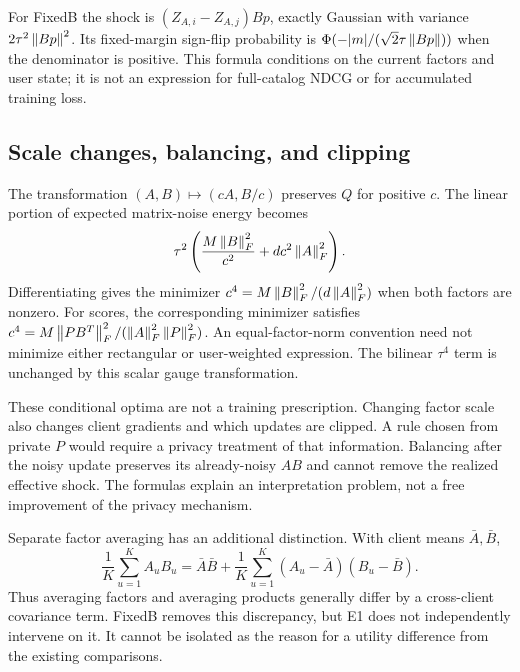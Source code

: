 For FixedB the shock is $(Z_{A,i}-Z_{A,j})Bp$, exactly Gaussian with
variance $2\tau^2\left\lVert Bp\right\rVert^2$. Its fixed-margin sign-flip probability is
$\Phi(-|m|/(\sqrt{2}\tau\left\lVert Bp\right\rVert))$ when the denominator is positive.
This formula conditions on the current factors and user state; it is not
an expression for full-catalog NDCG or for accumulated training loss.

\subsection{Scale changes, balancing, and clipping}
The transformation $(A,B)\mapsto(cA,B/c)$ preserves $Q$ for positive $c$.
The linear portion of expected matrix-noise energy becomes
\begin{equation}
 \tau^2\left(\frac{M\left\lVert B\right\rVert_F^2}{c^2}
                       +dc^2\left\lVert A\right\rVert_F^2\right).
\end{equation}
Differentiating gives the minimizer
$c^4=M\left\lVert B\right\rVert_F^2/(d\left\lVert A\right\rVert_F^2)$ when both factors are nonzero.
For scores, the corresponding minimizer satisfies
$c^4=M\left\lVert PB^T\right\rVert_F^2/(\left\lVert A\right\rVert_F^2\left\lVert P\right\rVert_F^2)$.
An equal-factor-norm convention need not minimize either rectangular or
user-weighted expression. The bilinear $\tau^4$ term is unchanged by
this scalar gauge transformation.

These conditional optima are not a training prescription. Changing factor
scale also changes client gradients and which updates are clipped. A rule
chosen from private $P$ would require a privacy treatment of that information.
Balancing after the noisy update preserves its already-noisy $AB$ and
cannot remove the realized effective shock. The formulas explain an
interpretation problem, not a free improvement of the privacy mechanism.

Separate factor averaging has an additional distinction. With client means
$\bar A,\bar B$,
\begin{equation}
 \frac1K\sum_{u=1}^K A_uB_u
 =\bar A\bar B+\frac1K\sum_{u=1}^K(A_u-\bar A)(B_u-\bar B).
\end{equation}
Thus averaging factors and averaging products generally differ by a
cross-client covariance term. FixedB removes this discrepancy, but E1
does not independently intervene on it. It cannot be isolated as the
reason for a utility difference from the existing comparisons.

